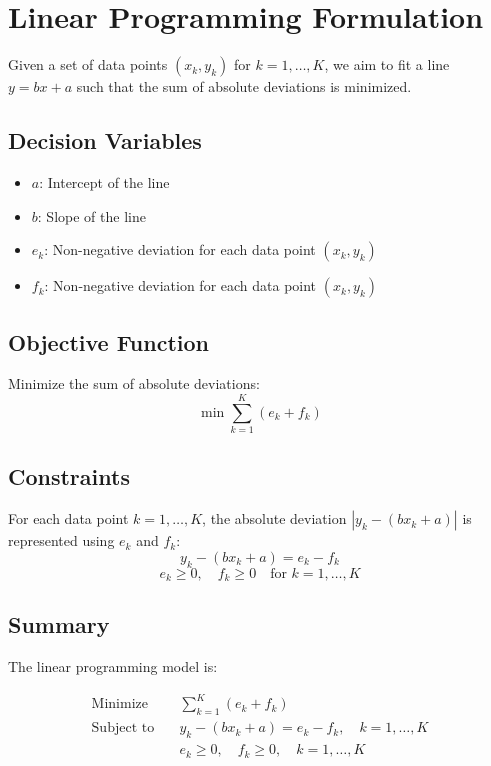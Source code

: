 \documentclass{article}
\begin{document}
\section*{Linear Programming Formulation}

Given a set of data points \((x_k, y_k)\) for \(k = 1, \ldots, K\), we aim to fit a line \( y = bx + a \) such that the sum of absolute deviations is minimized.

\subsection*{Decision Variables}

\begin{itemize}
    \item \(a\): Intercept of the line
    \item \(b\): Slope of the line
    \item \(e_k\): Non-negative deviation for each data point \((x_k, y_k)\)
    \item \(f_k\): Non-negative deviation for each data point \((x_k, y_k)\)
\end{itemize}

\subsection*{Objective Function}

Minimize the sum of absolute deviations:
\[
\min \sum_{k=1}^{K} (e_k + f_k)
\]

\subsection*{Constraints}

For each data point \( k = 1, \ldots, K \), the absolute deviation \( |y_k - (bx_k + a)| \) is represented using \(e_k\) and \(f_k\):
\[
y_k - (bx_k + a) = e_k - f_k
\]
\[
e_k \geq 0, \quad f_k \geq 0 \quad \text{for } k = 1, \ldots, K
\]

\subsection*{Summary}

The linear programming model is:

\[
\begin{align*}
\text{Minimize} \quad & \sum_{k=1}^{K} (e_k + f_k) \\
\text{Subject to} \quad & y_k - (bx_k + a) = e_k - f_k, \quad k = 1, \ldots, K \\
& e_k \geq 0, \quad f_k \geq 0, \quad k = 1, \ldots, K
\end{align*}
\]
\end{document}
